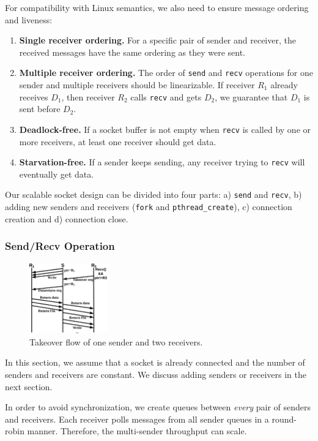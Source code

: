 For compatibility with Linux semantics, we also need to ensure message ordering and liveness:
\begin{enumerate}
\item \textbf{Single receiver ordering.} For a specific pair of sender and receiver, the received messages have the same ordering as they were sent.
\item \textbf{Multiple receiver ordering.} The order of \texttt{send} and \texttt{recv} operations for one sender and multiple receivers should be linearizable. If receiver $R_1$ already receives $D_1$, then receiver $R_2$ calls \texttt{recv} and gets $D_2$, we guarantee that $D_1$ is sent before $D_2$.
\item \textbf{Deadlock-free.} If a socket buffer is not empty when \texttt{recv} is called by one or more receivers, at least one receiver should get data.
\item \textbf{Starvation-free.} If a sender keeps sending, any receiver trying to \texttt{recv} will eventually get data.
\end{enumerate}

Our scalable socket design can be divided into four parts: a) \texttt{send} and \texttt{recv}, b) adding new senders and receivers (\texttt{fork} and \texttt{pthread\_create}), c) connection creation and d) connection close.

\subsubsection{Send/Recv Operation}
\label{subsubsec:fork_rdwr}
\begin{figure}[t]
	\centering
	\includegraphics[width=0.3\textwidth]{images/takeover}
	\caption{Takeover flow of one sender and two receivers.}
	\label{fig:fork-takeover}
	\vspace{-15pt}
\end{figure}
In this section, we assume that a socket is already connected and the number of senders and receivers are constant. We discuss adding senders or receivers in the next section.

In order to avoid synchronization, we create queues between \emph{every} pair of senders and receivers. %
Each receiver polls messages from all sender queues in a round-robin manner. Therefore, the multi-sender throughput can scale.

